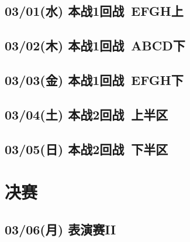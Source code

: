 \section{03/01(水) 本战1回战~EFGH上}
\section{03/02(木) 本战1回战~ABCD下}
\section{03/03(金) 本战1回战~EFGH下}
\section{03/04(土) 本战2回战~上半区}
\section{03/05(日) 本战2回战~下半区}

\chapter{决赛}

\section{03/06(月) 表演赛II}

